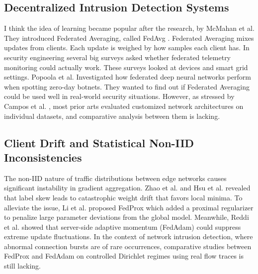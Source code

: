 \documentclass[conference]{IEEEtran}
\begin{document}
\subsection{Decentralized Intrusion Detection Systems}
I think the idea of learning became popular after the research, by McMahan et al. They introduced Federated Averaging, called FedAvg \cite{mcmahan2017communication}. Federated Averaging mixes updates from clients. Each update is weighed by how samples each client has. In security engineering several big surveys \cite{campos2022evaluating, mothukuri2021federated} asked whether federated telemetry monitoring could actually work. These surveys looked at devices and smart grid settings. Popoola et al. \cite{popoola2021federated} Investigated how federated deep neural networks perform when spotting zero-day botnets. They wanted to find out if Federated Averaging could be used well in real-world security situations. However, as stressed by Campos et al. \cite{campos2022evaluating}, most prior arts evaluated customized network architectures on individual datasets, and comparative analysis between them is lacking.

\subsection{Client Drift and Statistical Non-IID Inconsistencies}
The non-IID nature of traffic distributions between edge networks causes significant instability in gradient aggregation. Zhao et al. \cite{zhao2018federated} and Hsu et al. \cite{hsu2019measuring} revealed that label skew leads to catastrophic weight drift that favors local minima. To alleviate the issue, Li et al. \cite{li2020federated} proposed FedProx which added a proximal regularizer to penalize large parameter deviations from the global model. Meanwhile, Reddi et al. \cite{reddi2020adaptive} showed that server-side adaptive momentum (FedAdam) could suppress extreme update fluctuations. In the context of network intrusion detection, where abnormal connection bursts are of rare occurrences, comparative studies between FedProx and FedAdam on controlled Dirichlet regimes using real flow traces is still lacking.
\end{document}
